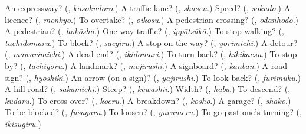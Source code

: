\begin{tcolorbox}[breakable,colback=teal!4,colframe=teal!35!black,title={Before you move on}]
An expressway? (\textbf{}, \emph{kōsokudōro}.) A traffic lane? (\textbf{}, \emph{shasen}.) Speed? (\textbf{}, \emph{sokudo}.) A licence? (\textbf{}, \emph{menkyo}.) To overtake? (\textbf{}, \emph{oikosu}.) A pedestrian crossing? (\textbf{}, \emph{ōdanhodō}.) A pedestrian? (\textbf{}, \emph{hokōsha}.) One-way traffic? (\textbf{}, \emph{ippōtsūkō}.) To stop walking? (\textbf{}, \emph{tachidomaru}.) To block? (\textbf{}, \emph{saegiru}.) A stop on the way? (\textbf{}, \emph{yorimichi}.) A detour? (\textbf{}, \emph{mawarimichi}.) A dead end? (\textbf{}, \emph{ikidomari}.) To turn back? (\textbf{}, \emph{hikikaesu}.) To stop by? (\textbf{}, \emph{tachiyoru}.) A landmark? (\textbf{}, \emph{mejirushi}.) A signboard? (\textbf{}, \emph{kanban}.) A road sign? (\textbf{}, \emph{hyōshiki}.) An arrow (on a sign)? (\textbf{}, \emph{yajirushi}.) To look back? (\textbf{}, \emph{furimuku}.) A hill road? (\textbf{}, \emph{sakamichi}.) Steep? (\textbf{}, \emph{kewashii}.) Width? (\textbf{}, \emph{haba}.) To descend? (\textbf{}, \emph{kudaru}.) To cross over? (\textbf{}, \emph{koeru}.) A breakdown? (\textbf{}, \emph{koshō}.) A garage? (\textbf{}, \emph{shako}.) To be blocked? (\textbf{}, \emph{fusagaru}.) To loosen? (\textbf{}, \emph{yurumeru}.) To go past one's turning? (\textbf{}, \emph{ikisugiru}.)
\end{tcolorbox}
